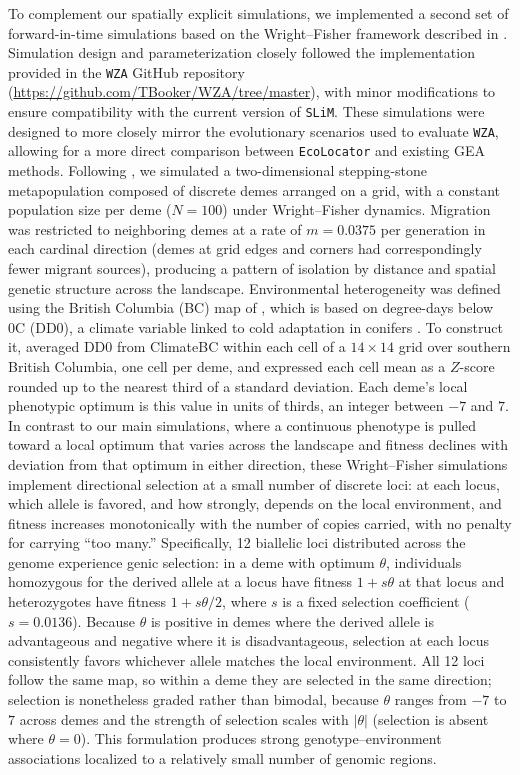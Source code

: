 \documentclass[]{article}
\newcommand{\ecolocator}{\texttt{EcoLocator}\xspace}
\newcommand{\slim}{\texttt{SLiM}\xspace}
\providecommand{\revpoint}[2]{}%
\begin{document}
To complement our spatially explicit simulations,
we implemented a second set of forward-in-time simulations
based on the Wright--Fisher framework
described in \citet{booker_wza_2024}.
Simulation design and parameterization closely followed
the implementation provided in the \texttt{WZA} GitHub repository
(\url{https://github.com/TBooker/WZA/tree/master}),
with minor modifications to ensure compatibility
with the current version of \slim.
These simulations were designed to more closely mirror
the evolutionary scenarios used to evaluate \texttt{WZA},
allowing for a more direct comparison
between \ecolocator and existing GEA methods.
Following \citet{booker_wza_2024},
we simulated a two-dimensional stepping-stone metapopulation
composed of discrete demes arranged on a grid,
with a constant population size per deme ($N=100$)
under Wright--Fisher dynamics.
Migration was restricted to neighboring demes at a rate of
$m=0.0375$ per generation in each cardinal direction
(demes at grid edges and corners had correspondingly fewer
migrant sources), producing a pattern of isolation by distance
and spatial genetic structure across the landscape.
Environmental heterogeneity was defined
using the British Columbia (BC) map of \citet{booker_wza_2024}\revpoint{2}{10},
which is based on degree-days below 0\textdegree{}C (DD0),
a climate variable linked to cold adaptation in conifers
\citep{yeaman_convergent_2016}.
To construct it, \citet{booker_wza_2024} averaged DD0 from ClimateBC
\citep{wang_locally_2016} within each cell of a $14 \times 14$ grid
over southern British Columbia, one cell per deme,
and expressed each cell mean as a $Z$-score rounded up to the nearest third
of a standard deviation.
Each deme's local phenotypic optimum is this value in units of thirds,
an integer between $-7$ and $7$.
In contrast to our main simulations,
where a continuous phenotype is pulled toward a local optimum 
that varies across the landscape and fitness declines with deviation 
from that optimum in either direction,
these Wright--Fisher simulations implement directional selection
at a small number of discrete loci:
at each locus, which allele is favored, and how strongly,
depends on the local environment, 
and fitness increases monotonically with the number of copies carried, 
with no penalty for carrying ``too many.''
Specifically, 12 biallelic loci distributed across the genome
experience genic selection:
in a deme with optimum $\theta$, individuals homozygous for the derived allele
at a locus have fitness $1 + s\theta$ at that locus
and heterozygotes have fitness $1 + s\theta/2$,
where $s$ is a fixed selection coefficient ($s=0.0136$).
Because $\theta$ is positive in demes where the 
derived allele is advantageous and negative where it is 
disadvantageous, selection at each locus consistently 
favors whichever allele matches the local environment.
All 12 loci follow the same map, so within a deme they are selected
in the same direction\revpoint{2}{11};
selection is nonetheless graded rather than bimodal,
because $\theta$ ranges from $-7$ to $7$ across demes
and the strength of selection scales with $|\theta|$
(selection is absent where $\theta = 0$).
This formulation produces strong genotype--environment associations
localized to a relatively small number of genomic regions.
\end{document}

